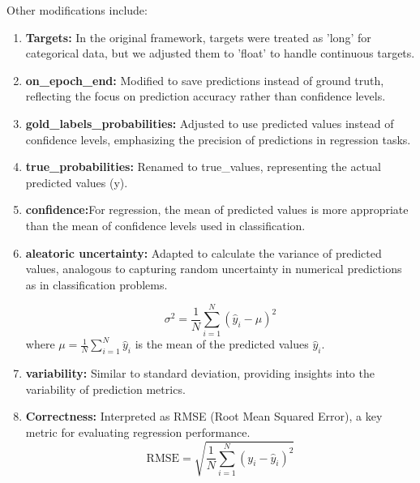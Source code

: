 \documentclass{article}
\theoremstyle{plain}
\theoremstyle{definition}
\theoremstyle{remark}
\begin{document}
Other modifications include:
\begin{enumerate}

\item \textbf{Targets:} In the original framework, targets were treated as 'long' for categorical data, but we adjusted them to 'float' to handle continuous targets.

\item \textbf{on\_epoch\_end:} Modified to save predictions instead of ground truth, reflecting the focus on prediction accuracy rather than confidence levels.

\item \textbf{gold\_labels\_probabilities:} Adjusted to use predicted values instead of confidence levels, emphasizing the precision of predictions in regression tasks.

\item \textbf{true\_probabilities:} Renamed to true\_values, representing the actual predicted values (y).

\item \textbf{confidence:}For regression, the mean of predicted values is more appropriate than the mean of confidence levels used in classification.

\item \textbf{aleatoric uncertainty:} Adapted to calculate the variance of predicted values, analogous to capturing random uncertainty in numerical predictions as in classification problems.

\[
\sigma^2 = \frac{1}{N} \sum_{i=1}^{N} \left( \hat{y}_i - \mu \right)^2
\]
where \( \mu = \frac{1}{N} \sum_{i=1}^{N} \hat{y}_i \) is the mean of the predicted values \( \hat{y}_i \).


\item \textbf{variability:} Similar to standard deviation, providing insights into the variability of prediction metrics.

\item \textbf{Correctness:} Interpreted as RMSE (Root Mean Squared Error), a key metric for evaluating regression performance.
\[
\text{RMSE} = \sqrt{\frac{1}{N} \sum_{i=1}^{N} \left( y_i - \hat{y}_i \right)^2}
\]


\end{enumerate}
\end{document}
